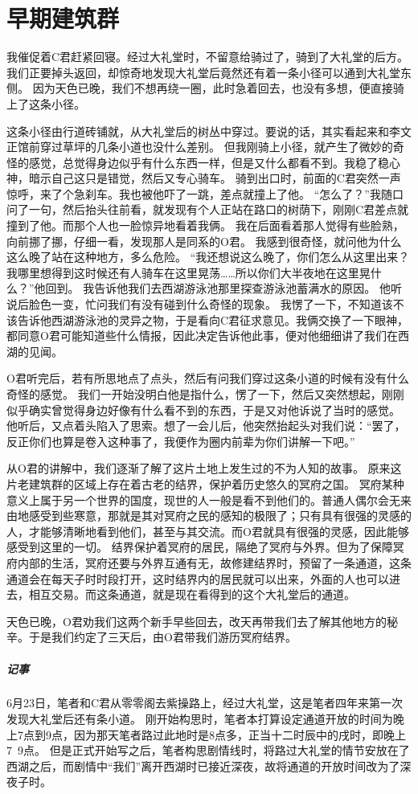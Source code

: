 \chapter{早期建筑群}

我催促着C君赶紧回寝。经过大礼堂时，不留意给骑过了，骑到了大礼堂的后方。
我们正要掉头返回，却惊奇地发现大礼堂后竟然还有着一条小径可以通到大礼堂东侧。
因为天色已晚，我们不想再绕一圈，此时急着回去，也没有多想，便直接骑上了这条小径。


这条小径由行道砖铺就，从大礼堂后的树丛中穿过。要说的话，其实看起来和李文正馆前穿过草坪的几条小道也没什么差别。
但我刚骑上小径，就产生了微妙的奇怪的感觉，总觉得身边似乎有什么东西一样，但是又什么都看不到。我稳了稳心神，暗示自己这只是错觉，然后又专心骑车。
骑到出口时，前面的C君突然一声惊呼，来了个急刹车。我也被他吓了一跳，差点就撞上了他。
“怎么了？”我随口问了一句，然后抬头往前看，就发现有个人正站在路口的树荫下，刚刚C君差点就撞到了他。而那个人也一脸惊异地看着我俩。
我在后面看着那人觉得有些脸熟，向前挪了挪，仔细一看，发现那人是同系的O君。
我感到很奇怪，就问他为什么这么晚了站在这种地方，多么危险。
“我还想说这么晚了，你们怎么从这里出来？我哪里想得到这时候还有人骑车在这里晃荡……所以你们大半夜地在这里晃什么？”他回到。
我告诉他我们去西湖游泳池那里探查游泳池蓄满水的原因。
他听说后脸色一变，忙问我们有没有碰到什么奇怪的现象。
我愣了一下，不知道该不该告诉他西湖游泳池的灵异之物，于是看向C君征求意见。我俩交换了一下眼神，都同意O君可能知道些什么情报，因此决定告诉他此事，便对他细细讲了我们在西湖的见闻。

O君听完后，若有所思地点了点头，然后有问我们穿过这条小道的时候有没有什么奇怪的感觉。
我们一开始没明白他是指什么，愣了一下，然后又突然想起，刚刚似乎确实曾觉得身边好像有什么看不到的东西，于是又对他诉说了当时的感觉。
他听后，又点着头陷入了思索。想了一会儿后，他突然抬起头对我们说：“罢了，反正你们也算是卷入这种事了，我便作为圈内前辈为你们讲解一下吧。”

从O君的讲解中，我们逐渐了解了这片土地上发生过的不为人知的故事。
原来这片老建筑群的区域上存在着古老的结界，保护着历史悠久的冥府之国。
冥府某种意义上属于另一个世界的国度，现世的人一般是看不到他们的。普通人偶尔会无来由地感受到些寒意，那就是其对冥府之民的感知的极限了；只有具有很强的灵感的人，才能够清晰地看到他们，甚至与其交流。而O君就具有很强的灵感，因此能够感受到这里的一切。
结界保护着冥府的居民，隔绝了冥府与外界。但为了保障冥府内部的生活，冥府还要与外界互通有无，故修建结界时，预留了一条通道，这条通道会在每天子时时段打开，这时结界内的居民就可以出来，外面的人也可以进去，相互交易。而这条通道，就是现在看得到的这个大礼堂后的通道。

天色已晚，O君劝我们这两个新手早些回去，改天再带我们去了解其他地方的秘辛。于是我们约定了三天后，由O君带我们游历冥府结界。

\vfill

\paragraph{记事}
6月23日，笔者和C君从零零阁去紫操路上，经过大礼堂，这是笔者四年来第一次发现大礼堂后还有条小道。
刚开始构思时，笔者本打算设定通道开放的时间为晚上7点到9点，因为那天笔者路过此地时是8点多，正当十二时辰中的戌时，即晚上7~9点。
但是正式开始写之后，笔者构思剧情线时，将路过大礼堂的情节安放在了西湖之后，而剧情中“我们”离开西湖时已接近深夜，故将通道的开放时间改为了深夜子时。
